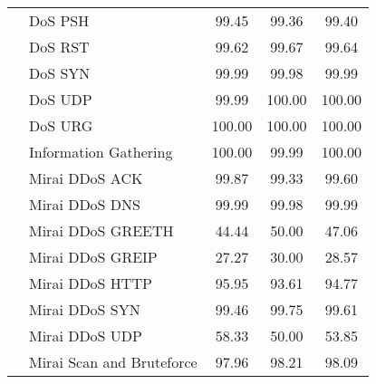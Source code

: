 \documentclass[lettersize,journal]{IEEEtran}
\begin{document}
\begin{table}[t]
\begin{tabularx}{\columnwidth}{l l CCC}
        {} & DoS PSH                 &      99.45 &   99.36 &     99.40 \\
        {} & DoS RST                 &      99.62 &   99.67 &     99.64 \\
        {} & DoS SYN                 &      99.99 &   99.98 &     99.99 \\
        {} & DoS UDP                 &      99.99 &  100.00 &    100.00 \\
        {} & DoS URG                 &     100.00 &  100.00 &    100.00 \\
        {} & Information Gathering   &     100.00 &   99.99 &    100.00 \\
        {} & Mirai DDoS ACK           &      99.87 &   99.33 &     99.60 \\
        {} & Mirai DDoS \ac{DNS}           &      99.99 &   99.98 &     99.99 \\
        {} & Mirai DDoS GREETH        &      44.44 &   50.00 &     47.06 \\
        {} & Mirai DDoS GREIP         &      27.27 &   30.00 &     28.57 \\
        {} & Mirai DDoS HTTP          &      95.95 &   93.61 &     94.77 \\
        {} & Mirai DDoS SYN           &      99.46 &   99.75 &     99.61 \\
        {} & Mirai DDoS UDP           &      58.33 &   50.00 &     53.85 \\
        {} & Mirai Scan and Bruteforce   &      97.96 &   98.21 &     98.09 \\  
        \bottomrule
    \end{tabularx} 
    \label{tab:exp_sup_multiclass_subtype_detailed}
\end{table} 
\end{document}
